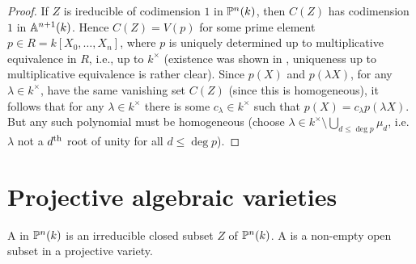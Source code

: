 \documentclass[a4paper,parskip=half,numbers=enddot, DIV=12]{scrreprt}
\begin{document}
\begin{proof}
If $Z$ is ireducible of codimension $1$ in $\mathbb{P}^n(k)$, then $C(Z)$ has codimension $1$ in $\mathbb{A}^{n+1}(k)$. Hence $C(Z) = V(p)$ for some prime element
$p\in R = k[X_0,\ldots,X_n]$, where $p$ is uniquely determined up to multiplicative equivalence in $R$, i.e., up to $k^\times$
(existence was shown in \cite[Proposition~2.1.3]{alg1}, uniqueness up to multiplicative equivalence is rather clear). 
Since $p(X)$ and $p(\lambda X)$, for any $\lambda\in k^\times$, have the same vanishing set $C(Z)$ (since this is homogeneous), it follows that for any $\lambda\in k^\times$ there is some $c_\lambda\in k^\times$ such that $p(X) = c_\lambda p(\lambda X)$. But any such polynomial must be homogeneous (choose $\lambda\in k^\times \setminus\bigcup_{d\leq\deg p} \mu_d$,
i.e. $\lambda$ not a $d^{\text{th}}$ root of unity for all $d\leq\deg p$).
\end{proof}

\section{Projective algebraic varieties}

\begin{defi}
    A  in $\mathbb{P}^n(k)$ is an irreducible closed subset $Z$ of $\mathbb{P}^n(k)$. A  is a non-empty open subset in a projective variety.
\end{defi}
\end{document}
